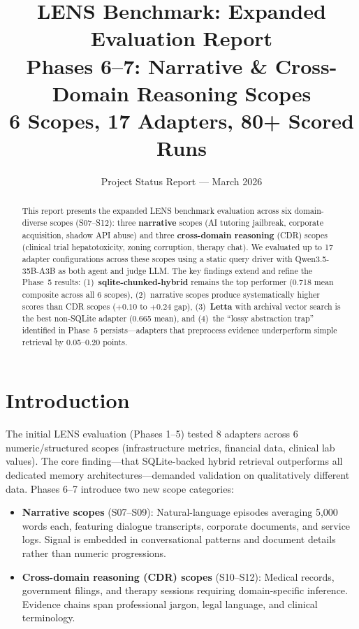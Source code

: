 \documentclass[11pt,letterpaper]{article}
\title{\textbf{LENS Benchmark: Expanded Evaluation Report}\\[0.3em]
\large Phases 6--7: Narrative \& Cross-Domain Reasoning Scopes\\[0.2em]
\normalsize 6 Scopes, 17 Adapters, 80+ Scored Runs}
\author{Project Status Report --- March 2026}
\date{}
\begin{document}
\maketitle
\thispagestyle{empty}

\begin{abstract}
\noindent
This report presents the expanded LENS benchmark evaluation across six domain-diverse scopes (S07--S12): three \textbf{narrative} scopes (AI tutoring jailbreak, corporate acquisition, shadow API abuse) and three \textbf{cross-domain reasoning} (CDR) scopes (clinical trial hepatotoxicity, zoning corruption, therapy chat). We evaluated up to 17 adapter configurations across these scopes using a static query driver with Qwen3.5-35B-A3B as both agent and judge LLM. The key findings extend and refine the Phase~5 results: (1)~\textbf{sqlite-chunked-hybrid} remains the top performer (0.718 mean composite across all 6 scopes), (2)~narrative scopes produce systematically higher scores than CDR scopes ($+0.10$ to $+0.24$ gap), (3)~\textbf{Letta} with archival vector search is the best non-SQLite adapter (0.665 mean), and (4)~the ``lossy abstraction trap'' identified in Phase~5 persists---adapters that preprocess evidence underperform simple retrieval by 0.05--0.20 points.
\end{abstract}

\tableofcontents
\newpage

\section{Introduction}

The initial LENS evaluation (Phases 1--5) tested 8 adapters across 6 numeric/structured scopes (infrastructure metrics, financial data, clinical lab values). The core finding---that SQLite-backed hybrid retrieval outperforms all dedicated memory architectures---demanded validation on qualitatively different data. Phases 6--7 introduce two new scope categories:

\begin{itemize}[nosep]
  \item \textbf{Narrative scopes} (S07--S09): Natural-language episodes averaging 5,000 words each, featuring dialogue transcripts, corporate documents, and service logs. Signal is embedded in conversational patterns and document details rather than numeric progressions.
  \item \textbf{Cross-domain reasoning (CDR) scopes} (S10--S12): Medical records, government filings, and therapy sessions requiring domain-specific inference. Evidence chains span professional jargon, legal language, and clinical terminology.
\end{itemize}
\end{document}
